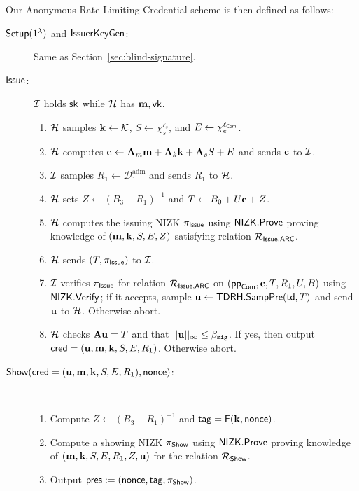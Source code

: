 Our Anonymous Rate-Limiting Credential scheme is then defined as follows:
\begin{description}
\item[$\mathsf{Setup}(1^\lambda)$ and $\mathsf{IssuerKeyGen}$:] Same as Section~\ref{sec:blind-signature}.

\item[$\mathsf{Issue}$:] \(\mathcal{I}\) holds \(\mathsf{sk}\) while \(\mathcal{H}\) has \(\mathbf{m},\mathsf{vk}\).
\begin{enumerate}
\item \(\mathcal{H}\) samples \(\mathbf{k}\gets \mathcal K\), \(S\gets \chi_s^{\ell_s}\), and
\(E\gets \chi_e^{\ell_{\mathsf{Com}}}\).
\item \(\mathcal{H}\) computes \(\mathbf{c}\gets \mathbf{A}_m\mathbf{m} + \mathbf{A}_k\mathbf{k} + \mathbf{A}_s S + E\) and sends \(\mathbf{c}\) to
\(\mathcal{I}\).
\item \(\mathcal{I}\) samples \(R_1\gets \mathcal D_1^{\mathrm{adm}}\) and sends \(R_1\) to \(\mathcal{H}\).
\item \(\mathcal{H}\) sets \(Z\gets (B_3-R_1)^{-1}\) and \(T\gets B_0 + U\mathbf{c} + Z\).
\item \(\mathcal{H}\) computes the issuing NIZK \(\pi_{\mathsf{Issue}}\) using \(\mathsf{NIZK}.\mathsf{Prove}\) proving knowledge
of \((\mathbf{m},\mathbf{k},S,E,Z)\) satisfying relation \(\mathcal{R}_{\mathsf{Issue,ARC}}\).
\item \(\mathcal{H}\) sends \((T,\pi_{\mathsf{Issue}})\) to \(\mathcal{I}\).
\item \(\mathcal{I}\) verifies \(\pi_{\mathsf{Issue}}\) for relation \(\mathcal{R}_{\mathsf{Issue,ARC}}\) on
\((\mathsf{pp}_{\mathsf{Com}},\mathbf{c},T,R_1,U,B)\) using \(\mathsf{NIZK}.\mathsf{Verify}\); if it accepts, sample
\(\mathbf{u} \gets \mathsf{TDRH}.\mathsf{SampPre}(\mathsf{td},T)\) and send \(\mathbf{u}\) to \(\mathcal{H}\). Otherwise abort.
\item \(\mathcal{H}\) checks \(\mathbf{A} \mathbf{u} = T\) and that \(||\mathbf{u}||_\infty \leq \beta_{\mathtt{sig}}\). If yes, then output
\(\mathsf{cred}=(\mathbf{u},\mathbf{m},\mathbf{k},S,E,R_1)\). Otherwise abort.
\end{enumerate}

\item[$\mathsf{Show}(\mathsf{cred}=(\mathbf{u},\mathbf{m},\mathbf{k},S,E,R_1),\mathsf{nonce})$:]~
\begin{enumerate}
\item Compute \(Z\gets (B_3-R_1)^{-1}\) and \(\mathsf{tag} = \mathsf{F}(\mathbf{k},\mathsf{nonce})\).
\item Compute a showing NIZK \(\pi_{\mathsf{Show}}\) using \(\mathsf{NIZK}.\mathsf{Prove}\) proving knowledge of
\((\mathbf{m},\mathbf{k},S,E,R_1,Z,\mathbf{u})\) for the relation \(\mathcal{R}_{\mathsf{Show}}\).
\item Output \(\mathsf{pres}:=(\mathsf{nonce},\mathsf{tag},\pi_{\mathsf{Show}})\).
\end{enumerate}


\end{description}
